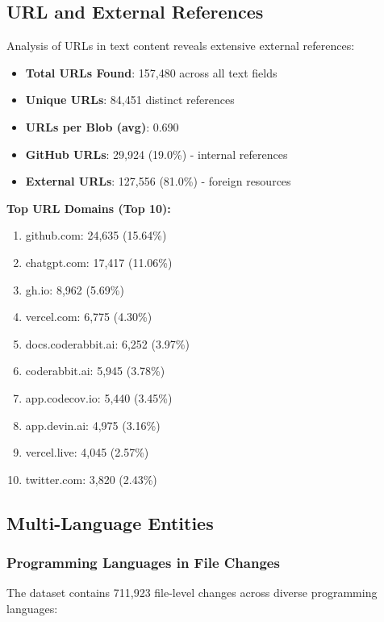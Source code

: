 \documentclass[11pt]{article}
\begin{document}
\subsection{URL and External References}

Analysis of URLs in text content reveals extensive external references:

\begin{itemize}
    \item \textbf{Total URLs Found}: 157,480 across all text fields
    \item \textbf{Unique URLs}: 84,451 distinct references
    \item \textbf{URLs per Blob (avg)}: 0.690
    \item \textbf{GitHub URLs}: 29,924 (19.0\%) - internal references
    \item \textbf{External URLs}: 127,556 (81.0\%) - foreign resources
\end{itemize}

\textbf{Top URL Domains (Top 10):}
\begin{enumerate}
    \item github.com: 24,635 (15.64\%)
    \item chatgpt.com: 17,417 (11.06\%)
    \item gh.io: 8,962 (5.69\%)
    \item vercel.com: 6,775 (4.30\%)
    \item docs.coderabbit.ai: 6,252 (3.97\%)
    \item coderabbit.ai: 5,945 (3.78\%)
    \item app.codecov.io: 5,440 (3.45\%)
    \item app.devin.ai: 4,975 (3.16\%)
    \item vercel.live: 4,045 (2.57\%)
    \item twitter.com: 3,820 (2.43\%)
\end{enumerate}

\subsection{Multi-Language Entities}

\subsubsection{Programming Languages in File Changes}

The dataset contains 711,923 file-level changes across diverse programming languages:
\end{document}
